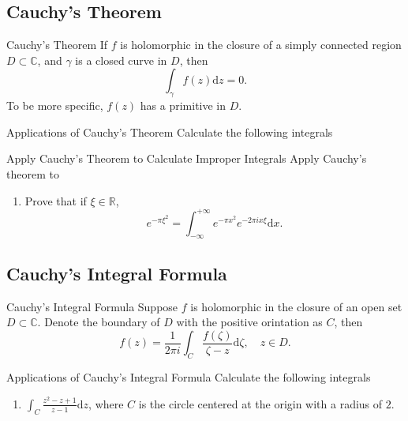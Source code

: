 \subsection{Cauchy's Theorem}

\begin{theorem}{Cauchy's Theorem}{}
  If $f$ is holomorphic in the closure of a simply connected region $D \subset \mathbb{C}$,
  and $\gamma$ is a closed curve in $D$, then
  \begin{equation}
    \int_{\gamma} f(z)\mathrm{d} z = 0.
  \end{equation}
  To be more specific, $f(z)$ has a primitive in $D$.
\end{theorem}

\begin{example}{Applications of Cauchy's Theorem}{}
  Calculate the following integrals
\end{example}

\begin{example}{Apply Cauchy's Theorem to Calculate Improper Integrals}{}
  Apply Cauchy's theorem to 
  \begin{enumerate}
  \item Prove that if $\xi \in \mathbb{R}$,
    \begin{equation}
      e^{- \pi \xi^2} = \int_{-\infty}^{+\infty} e^{-\pi x^2} e^{-2\pi i x \xi} \mathrm{d} x.
    \end{equation}
  \end{enumerate}
\end{example}

\subsection{Cauchy's Integral Formula}

\begin{theorem}{Cauchy's Integral Formula}{}
  Suppose $f$ is holomorphic in the closure of an open set $D \subset \mathbb{C}$.
  Denote the boundary of $D$ with the positive orintation as $C$, then
  \begin{equation}
    f(z) = \frac{1}{2 \pi i} \int_C \frac{f(\zeta)}{\zeta - z}\mathrm{d} \zeta, \quad
    z \in D.
  \end{equation}
\end{theorem}

\begin{example}{Applications of Cauchy's Integral Formula}{}
  Calculate the following integrals
  \begin{enumerate}
  \item $\int_C \frac{z^2 - z + 1}{z - 1}\mathrm{d} z$,
    where $C$ is the circle centered at the origin with a radius of $2$.
  \end{enumerate}
\end{example}

